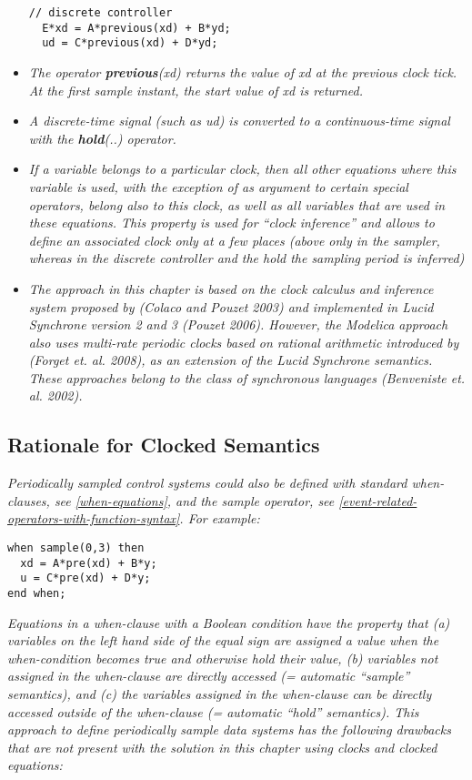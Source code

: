 \begin{itemize}
\begin{lstlisting}[language=modelica]
  // discrete controller
  E*xd = A*previous(xd) + B*yd;
  ud = C*previous(xd) + D*yd; 
\end{lstlisting}
\item
  \emph{The operator \textbf{previous}(xd) returns the value of xd at
  the previous clock tick. At the first sample instant, the start value
  of xd is returned.}
\item
  \emph{A discrete-time signal (such as ud) is converted to a
  continuous-time signal with the \textbf{hold}(..) operator.}
\item
  \emph{If a variable belongs to a particular clock, then all other
  equations where this variable is used, with the exception of as
  argument to certain special operators, belong also to this clock, as
  well as all variables that are used in these equations. This property
  is used for ``clock inference'' and allows to define an associated
  clock only at a few places (above only in the sampler, whereas in the
  discrete controller and the hold the sampling period is inferred)}
\item
  \emph{The approach in this chapter is based on the clock calculus and
  inference system proposed by (Colaco and Pouzet 2003) and implemented
  in Lucid Synchrone version 2 and 3 (Pouzet 2006). However, the
  Modelica approach also uses multi-rate periodic clocks based on
  rational arithmetic introduced by (Forget et. al. 2008), as an
  extension of the Lucid Synchrone semantics. These approaches belong to
  the class of synchronous languages (Benveniste et. al. 2002). }
\end{itemize}

\subsection{Rationale for Clocked Semantics}

\emph{Periodically sampled control systems could also be defined with
standard when-clauses, see \autoref{when-equations}, and the sample operator, see
\autoref{event-related-operators-with-function-syntax}. For example:}
\begin{lstlisting}[language=modelica]
when sample(0,3) then
  xd = A*pre(xd) + B*y;
  u = C*pre(xd) + D*y;
end when;
\end{lstlisting}

\emph{Equations in a when-clause with a Boolean condition have the
property that (a) variables on the left hand side of the equal sign are
assigned a value when the when-condition becomes true and otherwise hold
their value, (b) variables not assigned in the when-clause are directly
accessed (= automatic ``sample'' semantics), and (c) the variables
assigned in the when-clause can be directly accessed outside of the
when-clause (= automatic ``hold'' semantics). This approach to define
periodically sample data systems has the following drawbacks that are
not present with the solution in this chapter using clocks and clocked
equations:}

